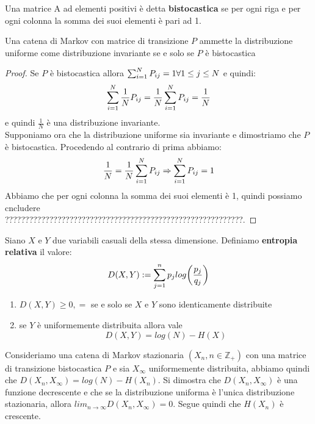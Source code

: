 \begin{defi}
Una matrice A ad elementi positivi è detta \textbf{bistocastica} se per ogni riga e per ogni colonna la somma dei suoi elementi è pari ad 1.
\end{defi}
\begin{teo}
Una catena di Markov con matrice di transizione $P$ ammette la distribuzione uniforme come distribuzione invariante se e solo se $P$ è bistocastica
\end{teo}
\begin{proof}
Se $P$ è bistocastica allora $ \sum_{i=1}^N P_{ij}=1 \forall 1\leq j \leq N$ e quindi:
$$\sum_{i=1}^N \frac{1}{N}P_{ij}=\frac{1}{N}\sum_{i=1}^N P_{ij}=\frac{1}{N}$$
e quindi $\frac{1}{N}$ è una distribuzione invariante.\\
Supponiamo ora che la distribuzione uniforme sia invariante e dimostriamo che $P$ è bistocastica. Procedendo al contrario di prima abbiamo:
$$\frac{1}{N}=\frac{1}{N} \sum_{i=1}^N P_{ij} \Rightarrow \sum_{i=1}^N P_{ij}=1$$
Abbiamo che per ogni colonna la somma dei suoi elementi è 1, quindi possiamo cncludere\\
???????????????????????????????????????????????????????????.
\end{proof}

\begin{defi}
Siano $X$ e $Y$ due variabili casuali della stessa dimensione.
Definiamo \textbf{entropia relativa} il valore:
\begin{equation}
D(X,Y):=\sum_{j=1}^n p_j log \bigg( \frac{p_j}{q_j} \bigg)
\end{equation}
\end{defi}
\begin{teo}
\begin{enumerate}
Per l'entropia relativa vale:
\item $D(X,Y)\geq 0, =$ se e solo se $X$ e $Y$ sono identicamente distribuite
\item se $Y$ è uniformemente distribuita allora vale
\begin{equation}
D(X,Y)=log(N)-H(X)
\end{equation}
\end{enumerate}
\end{teo}
Consideriamo una catena di Markov stazionaria $(X_n,n \in \mathbb{Z}_+)$ con una matrice di transizione bistocastica $P$ e sia $X_{\infty}$ uniformemente distribuita, abbiamo quindi che $D(X_n,X_{\infty})=log(N)-H(X_n)$. Si dimostra che $D(X_n,X_{\infty})$ è una funzione decrescente e che se la distribuzione uniforma è l'unica distribuzione stazionaria, allora $lim_{n \to \infty}D(X_n,X_{\infty})=0$. Segue quindi che $H(X_n)$ è crescente. \cite{Thomas}



